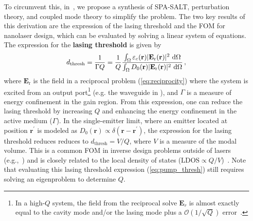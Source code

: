 To circumvent this, in~\cite{ownpub4}, we propose a synthesis of SPA-SALT, perturbation theory, and coupled mode theory to simplify the problem. 
The two key results of this derivation are the expression of the lasing threshold and the FOM for nanolaser design, which can be evaluated by solving a linear system of equations.
The expression for the \textbf{lasing threshold} is given by~\cite{ownpub4}
\begin{equation}\label{eq:pump_thresh}
 d_\text{thresh} = \frac{1}{\Gamma Q} = \frac{1}{Q} \frac{\int_{\Omega} \varepsilon_c(\mathbf{r})|\mathbf{E}_{\text{r}}(\mathbf{r})|^2\, \mathop{}\!\text{d} \Omega}{\int_{\Omega} D_0(\mathbf{r}) |\mathbf{E}_{\text{r}}(\mathbf{r})|^2\, \mathop{}\!\text{d} \Omega}\,,
\end{equation}
where $\mathbf{E}_\text{r}$ is the field in a reciprocal problem (\eqref{eq:reciprocity}) where the system is excited from an output port\footnote{In a high-$Q$ system, the field from the reciprocal solve $\mathbf{E}_r$ is almost exactly equal to the cavity mode and/or the lasing mode plus a $\mathcal{O}(1/\sqrt{Q})$ error~\cite{phot_crys}.} (e.g. the waveguide in ), and $\Gamma$ is a measure 
of energy confinement in the gain region. From this expression, one can reduce the lasing threshold by increasing $Q$ and enhancing the energy confinement in the
active medium ($\Gamma$). In the single-emitter limit, where an emitter located at position \(\mathbf{r}^\prime\) is modeled as 
\(D_0(\mathbf{r}) \propto \delta(\mathbf{r} - \mathbf{r}^\prime)\), 
the expression for the lasing threshold reduces  reduces to \(d_{\text{thresh}} = V / Q\), where $V$ is a measure of the modal volume. This is a common FOM in inverse design problems outside of lasers (e.g.,~\cite{LDOS_opt_wang}) and is closely
related to the local density of states ($ \text{LDOS} \propto Q/V$)~\cite{LDOS_opt_wang}.
   Note that evaluating this lasing threshold expression (\eqref{eq:pump_thresh}) still requires solving an eigenproblem to determine \(Q\).


